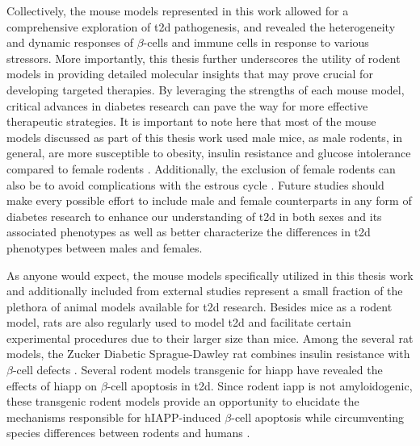 \par Collectively, the mouse models represented in this work allowed for a comprehensive exploration of \gls{t2d} pathogenesis, and revealed the heterogeneity and dynamic responses of $\beta$-cells and immune cells in response to various stressors. More importantly, this thesis further underscores the utility of rodent models in providing detailed molecular insights that may prove crucial for developing targeted therapies. By leveraging the strengths of each mouse model, critical advances in diabetes research can pave the way for more effective therapeutic strategies. It is important to note here that most of the mouse models discussed as part of this thesis work used male mice, as male rodents, in general, are more susceptible to obesity, insulin resistance and glucose intolerance compared to female rodents \textbf{\cite{lutz_mammalian_2023}}. Additionally, the exclusion of female rodents can also be to avoid complications with the estrous cycle \textbf{\cite{stott_high_2020}}. Future studies should make every possible effort to include male and female counterparts in any form of diabetes research to enhance our understanding of \gls{t2d} in both sexes and its associated phenotypes as well as better characterize the differences in \gls{t2d} phenotypes between males and females.\\

\par As anyone would expect, the mouse models specifically utilized in this thesis work and additionally included from external studies represent a small fraction of the plethora of animal models available for \gls{t2d} research. Besides mice as a rodent model, rats are also regularly used to model \gls{t2d} and facilitate certain experimental procedures due to their larger size than mice. Among the several rat models, the Zucker Diabetic Sprague-Dawley rat combines insulin resistance with $\beta$-cell defects \textbf{\cite{peterson_characterization_2015,lutz_mammalian_2023}}. Several rodent models transgenic for \gls{hiapp} have revealed the effects of \gls{hiapp} on $\beta$-cell apoptosis in \gls{t2d}. Since rodent \gls{iapp} is not amyloidogenic, these transgenic rodent models provide an opportunity to elucidate the mechanisms responsible for hIAPP-induced $\beta$-cell apoptosis while circumventing species differences between rodents and humans \textbf{\cite{matveyenko_islet_2006,hoppener_human_2008}}.\\


